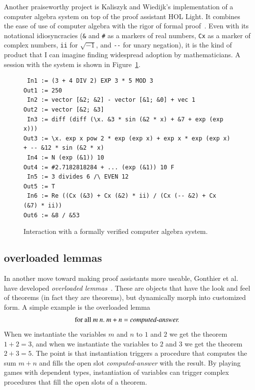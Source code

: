 \documentclass{llncs}
\begin{document}

\smallskip

Another praiseworthy project is Kaliszyk and Wiedijk's implementation
of a computer algebra system on top of the proof assistant HOL Light.
It combines the ease of use of computer algebra with the rigor of
formal proof~\cite{kaliszyk_p04_calc}.  Even with its notational
idiosyncracies (\verb!&! and \verb!#! as a markers of real numbers,
\verb!Cx! as a marker of complex numbers, \verb!ii! for $\sqrt{-1}$,
and \verb!--! for unary negation), it is the kind of product that I
can imagine finding widespread adoption by mathematicians. A session
with the system is shown in Figure~\ref{fig:kw}.

\begin{figure}
\begin{verbatim}
 In1 := (3 + 4 DIV 2) EXP 3 * 5 MOD 3 
Out1 := 250 
 In2 := vector [&2; &2] - vector [&1; &0] + vec 1 
Out2 := vector [&2; &3] 
 In3 := diff (diff (\x. &3 * sin (&2 * x) + &7 + exp (exp x))) 
Out3 := \x. exp x pow 2 * exp (exp x) + exp x * exp (exp x) + -- &12 * sin (&2 * x) 
 In4 := N (exp (&1)) 10 
Out4 := #2.7182818284 + ... (exp (&1)) 10 F 
 In5 := 3 divides 6 /\ EVEN 12 
Out5 := T 
 In6 := Re ((Cx (&3) + Cx (&2) * ii) / (Cx (-- &2) + Cx (&7) * ii)) 
Out6 := &8 / &53 
\end{verbatim}
\caption{Interaction with a formally verified computer algebra system.}
\label{fig:kw}
\end{figure}


\subsection{overloaded lemmas}



In another move toward making proof assistants more useable, Gonthier et al.
have developed {\it overloaded lemmas}~\cite{gonHoc}.  These are objects that have
the look and feel of theorems (in fact they are theorems), but dynamically
morph into customized form.
A simple example is the overloaded lemma
\[
\text{for all}~m~n.~m+n  = \text{\it computed-answer.}
\]
When we instantiate the variables $m$ and $n$ to $1$ and $2$ we get
the theorem $1+2=3$, and when we instantiate the variables to $2$ and
$3$ we get the theorem $2+3=5$.  The point is that instantiation
triggers a procedure that computes the sum $m+n$ and fills the open
slot {\it computed-answer} with the result.   By playing
games with dependent types,
instantiation of variables can trigger complex procedures
that fill the open slots of a theorem.
\end{document}
